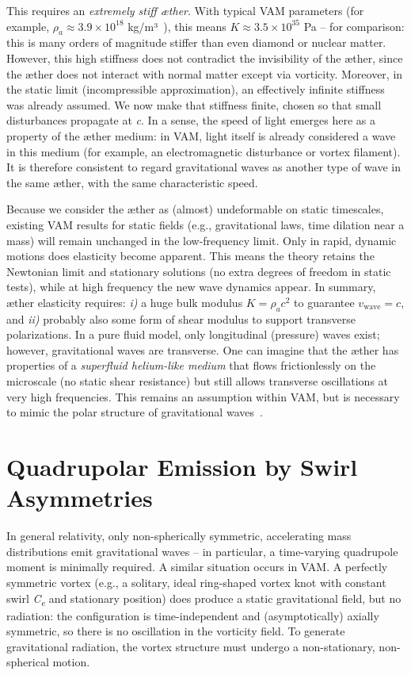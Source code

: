 This requires an \textit{extremely stiff æther}. With typical VAM parameters (for example, $ρ_a \approx 3.9\times10^{18}$ kg/m³~\cite{iskandarani2025VAM2}), this means $K \approx 3.5\times10^{35}$ Pa – for comparison: this is many orders of magnitude stiffer than even diamond or nuclear matter. However, this high stiffness does not contradict the invisibility of the æther, since the æther does not interact with normal matter except via vorticity. Moreover, in the static limit (incompressible approximation), an effectively infinite stiffness was already assumed. We now make that stiffness finite, chosen so that small disturbances propagate at \textit{c}. In a sense, the speed of light emerges here as a property of the æther medium: in VAM, light itself is already considered a wave in this medium (for example, an electromagnetic disturbance or vortex filament). It is therefore consistent to regard gravitational waves as another type of wave in the same æther, with the same characteristic speed.

Because we consider the æther as (almost) undeformable on static timescales, existing VAM results for static fields (e.g., gravitational laws, time dilation near a mass) will remain unchanged in the low-frequency limit. Only in rapid, dynamic motions does elasticity become apparent. This means the theory retains the Newtonian limit and stationary solutions (no extra degrees of freedom in static tests), while at high frequency the new wave dynamics appear. In summary, æther elasticity requires: \textit{i)} a huge bulk modulus $K = ρ_a c^2$ to guarantee $v_\text{wave} = c$, and \textit{ii)} probably also some form of shear modulus to support transverse polarizations. In a pure fluid model, only longitudinal (pressure) waves exist; however, gravitational waves are transverse. One can imagine that the æther has properties of a \textit{superfluid helium-like medium} that flows frictionlessly on the microscale (no static shear resistance) but still allows transverse oscillations at very high frequencies. This remains an assumption within VAM, but is necessary to mimic the polar structure of gravitational waves~\cite{iskandarani2025VAM3}.

\section*{Quadrupolar Emission by Swirl Asymmetries}
In general relativity, only non-spherically symmetric, accelerating mass distributions emit gravitational waves – in particular, a time-varying quadrupole moment is minimally required. A similar situation occurs in VAM. A perfectly symmetric vortex (e.g., a solitary, ideal ring-shaped vortex knot with constant swirl \textit{C\textsubscript{e}} and stationary position) does produce a static gravitational field, but no radiation: the configuration is time-independent and (asymptotically) axially symmetric, so there is no oscillation in the vorticity field. To generate gravitational radiation, the vortex structure must undergo a non-stationary, non-spherical motion.

